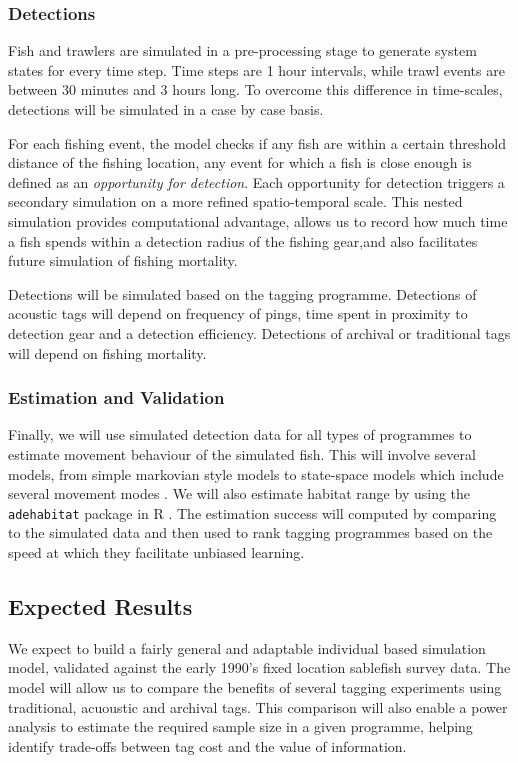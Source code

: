 \documentclass{article}
\begin{document}
\subsubsection*{Detections}

Fish and trawlers are simulated in a pre-processing stage to generate system states for every time step. Time steps are 1 hour intervals, while trawl events are between 30 minutes and 3 hours long. To overcome this difference in time-scales, detections will be simulated in a case by case basis.

For each fishing event, the model checks if any fish are within a certain threshold distance of the fishing location, any event for which a fish is close enough is defined as an {\it opportunity for detection}. Each opportunity for detection triggers a secondary simulation on a more refined spatio-temporal scale. This nested simulation provides computational advantage, allows us to record how much time a fish spends within a detection radius of the fishing gear,and also facilitates future simulation of fishing mortality. 

Detections will be simulated based on the tagging programme. Detections of acoustic tags will depend on frequency of pings, time spent in proximity to detection gear and a detection efficiency. Detections of archival or traditional tags will depend on fishing mortality.

\subsubsection*{Estimation and Validation}

Finally, we will use simulated detection data for all types of programmes to estimate movement behaviour of the simulated fish. This will involve several models, from simple markovian style models \citep{mcgarvey2002estimating} to state-space models which include several movement modes \citep{fryxell2008multiple}. We will also estimate habitat range by using the \verb+adehabitat+
package in R \citep{calenge2006package}. The estimation success will computed by comparing to the simulated data and then used to rank tagging programmes based on the speed at which they facilitate unbiased learning.


\subsection{Expected Results}

We expect to build a fairly general and adaptable individual based simulation model, validated against the early 1990's fixed location sablefish survey data. The model will allow us to compare the benefits of several tagging experiments using traditional, acuoustic and archival tags. This comparison will also enable a power analysis to estimate the required sample size in a given programme, helping identify trade-offs between tag cost and the value of information.
\end{document}
